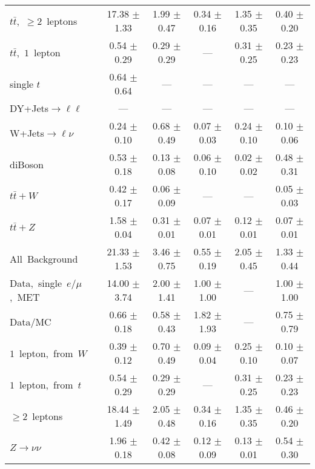 \documentclass{article}
\begin{document}
\begin{longtable}{|l|c|c|c|c|c|}
$t\bar{t}$,~$\ge2$~leptons & 17.38 $\pm$ 1.33  & 1.99 $\pm$ 0.47  & 0.34 $\pm$ 0.16  & 1.35 $\pm$ 0.35  & 0.40 $\pm$ 0.20 \\* 
$t\bar{t}$,~$1$~lepton & 0.54 $\pm$ 0.29  & 0.29 $\pm$ 0.29  & ---  & 0.31 $\pm$ 0.25  & 0.23 $\pm$ 0.23 \\* 
single $t$  & 0.64 $\pm$ 0.64  & ---  & ---  & ---  & --- \\* 
DY+Jets$\rightarrow\ell\ell$  & ---  & ---  & ---  & ---  & --- \\* 
W+Jets$\rightarrow\ell\nu$  & 0.24 $\pm$ 0.10  & 0.68 $\pm$ 0.49  & 0.07 $\pm$ 0.03  & 0.24 $\pm$ 0.10  & 0.10 $\pm$ 0.06 \\* 
diBoson  & 0.53 $\pm$ 0.18  & 0.13 $\pm$ 0.08  & 0.06 $\pm$ 0.10  & 0.02 $\pm$ 0.02  & 0.48 $\pm$ 0.31 \\* 
$t\bar{t}+W$  & 0.42 $\pm$ 0.17  & 0.06 $\pm$ 0.09  & ---  & ---  & 0.05 $\pm$ 0.03 \\* 
$t\bar{t}+Z$  & 1.58 $\pm$ 0.04  & 0.31 $\pm$ 0.01  & 0.07 $\pm$ 0.01  & 0.12 $\pm$ 0.01  & 0.07 $\pm$ 0.01 \\* 
\hline \hline 
All~Background  & 21.33 $\pm$ 1.53  & 3.46 $\pm$ 0.75  & 0.55 $\pm$ 0.19  & 2.05 $\pm$ 0.45  & 1.33 $\pm$ 0.44 \\* 
Data,~single~$e/\mu$,~MET  & 14.00 $\pm$ 3.74  & 2.00 $\pm$ 1.41  & 1.00 $\pm$ 1.00  & ---  & 1.00 $\pm$ 1.00 \\* 
Data/MC  & 0.66 $\pm$ 0.18  & 0.58 $\pm$ 0.43  & 1.82 $\pm$ 1.93  & ---  & 0.75 $\pm$ 0.79 \\* 
\hline \hline 
$1$~lepton,~from~$W$  & 0.39 $\pm$ 0.12  & 0.70 $\pm$ 0.49  & 0.09 $\pm$ 0.04  & 0.25 $\pm$ 0.10  & 0.10 $\pm$ 0.07 \\* 
$1$~lepton,~from~$t$  & 0.54 $\pm$ 0.29  & 0.29 $\pm$ 0.29  & ---  & 0.31 $\pm$ 0.25  & 0.23 $\pm$ 0.23 \\* 
$\ge2$~leptons  & 18.44 $\pm$ 1.49  & 2.05 $\pm$ 0.48  & 0.34 $\pm$ 0.16  & 1.35 $\pm$ 0.35  & 0.46 $\pm$ 0.20 \\* 
$Z\rightarrow\nu\nu$  & 1.96 $\pm$ 0.18  & 0.42 $\pm$ 0.08  & 0.12 $\pm$ 0.09  & 0.13 $\pm$ 0.01  & 0.54 $\pm$ 0.30 \\* 
\hline 
\end{longtable} 

 
 
 
 
\pagebreak 

 
 
 
 
\end{document}
